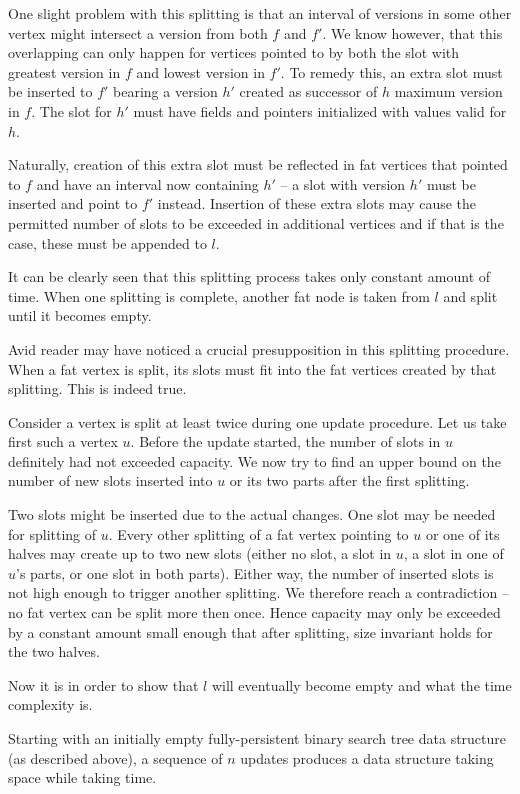 One slight problem with this splitting is that an interval of versions in some other vertex might intersect a version from both $f$ and $f'$. We know however, that this overlapping can only happen for vertices pointed to by both the slot with greatest version in $f$ and lowest version in $f'$. To remedy this, an extra slot must be inserted to $f'$ bearing a version $h'$ created as successor of $h$ maximum version in $f$. The slot for $h'$ must have fields and pointers initialized with values valid for $h$.

Naturally, creation of this extra slot must be reflected in fat vertices that pointed to $f$ and have an interval now containing $h'$ -- a slot with version $h'$ must be inserted and point to $f'$ instead. Insertion of these extra slots may cause the permitted number of slots to be exceeded in additional vertices and if that is the case, these must be appended to $l$.

It can be clearly seen that this splitting process takes only constant amount of time. When one splitting is complete, another fat node is taken from $l$ and split until it becomes empty.

Avid reader may have noticed a crucial presupposition in this splitting procedure. When a fat vertex is split, its slots must fit into the fat vertices created by that splitting. This is indeed true.

Consider a vertex is split at least twice during one update procedure. Let us take first such a vertex $u$. Before the update started, the number of slots in $u$ definitely had not exceeded capacity. We now try to find an upper bound on the number of new slots inserted into $u$ or its two parts after the first splitting.

Two slots might be inserted due to the actual changes. One slot may be needed for splitting of $u$.
Every other splitting of a fat vertex pointing to $u$ or one of its halves may create up to two new slots (either no slot, a slot in $u$, a slot in one of $u$'s parts, or one slot in both parts). 
Either way, the number of inserted slots is not high enough to trigger another splitting. We therefore reach a contradiction -- no fat vertex can be split more then once. Hence capacity may only be exceeded by a constant amount small enough that after splitting, size invariant holds for the two halves.

Now it is in order to show that $l$ will eventually become empty and what the time complexity is.

\begin{prop}
Starting with an initially empty fully-persistent binary search tree data structure (as described above), a sequence of $n$ updates produces a data structure taking  space while taking  time.
\end{prop}

